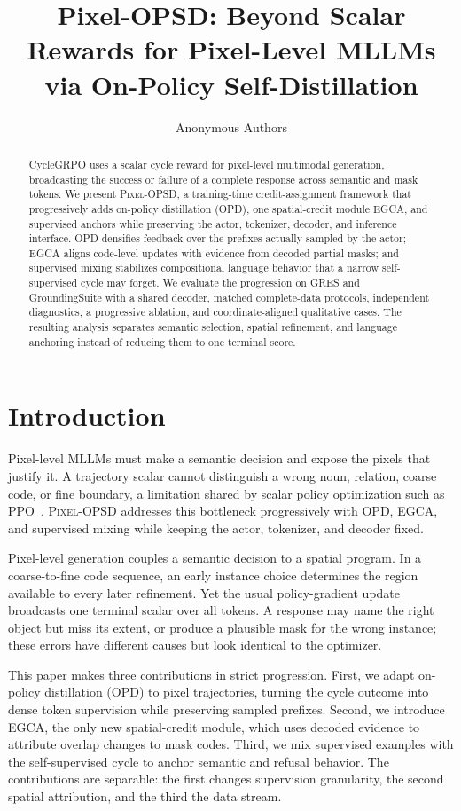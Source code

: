 \documentclass{article}
\title{Pixel-OPSD: Beyond Scalar Rewards for Pixel-Level MLLMs via On-Policy Self-Distillation}\author{Anonymous Authors}
\newcommand{\ours}{\textsc{Pixel-OPSD}}
\begin{document}
\setlength{\extrarowheight}{2pt}\raggedbottom\begingroup{}\maketitle\endgroup
\begin{abstract}CycleGRPO uses a scalar cycle reward for pixel-level multimodal generation, broadcasting the success or failure of a complete response across semantic and mask tokens. We present \ours{}, a training-time credit-assignment framework that progressively adds on-policy distillation (OPD), one spatial-credit module EGCA, and supervised anchors while preserving the actor, tokenizer, decoder, and inference interface. OPD densifies feedback over the prefixes actually sampled by the actor; EGCA aligns code-level updates with evidence from decoded partial masks; and supervised mixing stabilizes compositional language behavior that a narrow self-supervised cycle may forget. We evaluate the progression on GRES and GroundingSuite with a shared decoder, matched complete-data protocols, independent diagnostics, a progressive ablation, and coordinate-aligned qualitative cases. The resulting analysis separates semantic selection, spatial refinement, and language anchoring instead of reducing them to one terminal score.\end{abstract}
\section{Introduction}Pixel-level MLLMs must make a semantic decision and expose the pixels that justify it. A trajectory scalar cannot distinguish a wrong noun, relation, coarse code, or fine boundary, a limitation shared by scalar policy optimization such as PPO~\citep{shulman2017ppo}. \ours{} addresses this bottleneck progressively with OPD, EGCA, and supervised mixing while keeping the actor, tokenizer, and decoder fixed.

Pixel-level generation couples a semantic decision to a spatial program. In a coarse-to-fine code sequence, an early instance choice determines the region available to every later refinement. Yet the usual policy-gradient update broadcasts one terminal scalar over all tokens. A response may name the right object but miss its extent, or produce a plausible mask for the wrong instance; these errors have different causes but look identical to the optimizer.

This paper makes three contributions in strict progression. First, we adapt on-policy distillation (OPD) to pixel trajectories, turning the cycle outcome into dense token supervision while preserving sampled prefixes. Second, we introduce EGCA, the only new spatial-credit module, which uses decoded evidence to attribute overlap changes to mask codes. Third, we mix supervised examples with the self-supervised cycle to anchor semantic and refusal behavior. The contributions are separable: the first changes supervision granularity, the second spatial attribution, and the third the data stream.
\end{document}
